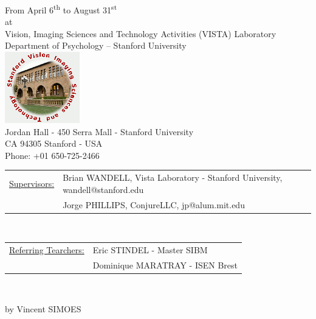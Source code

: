 \documentclass[a4paper,11pt]{report}
\begin{document}
\begin{titlepage}
\begin{center}
From April 6\textsuperscript{th} to August 31\textsuperscript{st}\vspace{0.8cm}
\\at\\Vision, Imaging Sciences and Technology Activities (VISTA) Laboratory\\Department of Psychology – Stanford University\vspace{0.5cm}\\
\includegraphics[scale=0.9]{images/Logo_vista.png}\vspace{0.5cm}\\
Jordan Hall - 450 Serra Mall - Stanford University\\CA 94305 Stanford - USA\\Phone: +01 650-725-2466\\
\end{center}
\bigskip
\bigskip
\bigskip
\begin{tabular}{*{2}ll}
\underline{Supervisors:} &Brian WANDELL, Vista Laboratory - Stanford University, wandell@stanford.edu\\
&Jorge PHILLIPS, ConjureLLC, jp@alum.mit.edu\\
\end{tabular}
\vspace{0.5cm}\\
\begin{tabular}{*{2}l}
\underline{Referring Tearchers:} &Eric STINDEL - Master SIBM\\
&Dominique MARATRAY - ISEN Brest
\end{tabular}
\vspace{0.7cm}\\
\begin{flushright}by Vincent SIMOES\end{flushright}
\end{titlepage}



\tableofcontents
{}
\listoffigures






\end{document}
